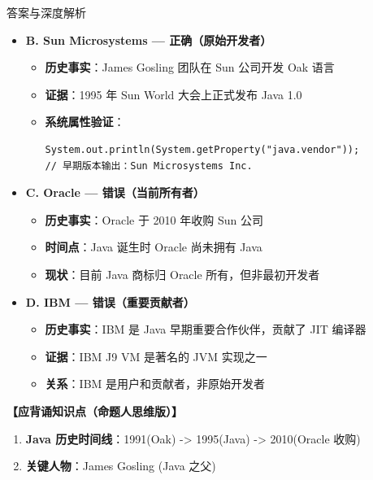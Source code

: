 \documentclass[12pt, a4paper]{ctexart}
\begin{document}
\begin{enumerate}[label=\textbf{\arabic*.}, itemsep=1em]
\begin{bluebox}{答案与深度解析}
\begin{itemize}[leftmargin=*, nosep]
        \item \textbf{B. Sun Microsystems — 正确（原始开发者）}
        \begin{itemize}[leftmargin=*, nosep]
            \item \textbf{历史事实}：James Gosling 团队在 Sun 公司开发 Oak 语言
            \item \textbf{证据}：1995 年 Sun World 大会上正式发布 Java 1.0
            \item \textbf{系统属性验证}：
            \begin{lstlisting}[style=JavaExam]
System.out.println(System.getProperty("java.vendor"));
// 早期版本输出：Sun Microsystems Inc.
            \end{lstlisting}
        \end{itemize}
        
        \item \textbf{C. Oracle — 错误（当前所有者）}
        \begin{itemize}[leftmargin=*, nosep]
            \item \textbf{历史事实}：Oracle 于 2010 年收购 Sun 公司
            \item \textbf{时间点}：Java 诞生时 Oracle 尚未拥有 Java
            \item \textbf{现状}：目前 Java 商标归 Oracle 所有，但非最初开发者
        \end{itemize}
        
        \item \textbf{D. IBM — 错误（重要贡献者）}
        \begin{itemize}[leftmargin=*, nosep]
            \item \textbf{历史事实}：IBM 是 Java 早期重要合作伙伴，贡献了 JIT 编译器
            \item \textbf{证据}：IBM J9 VM 是著名的 JVM 实现之一
            \item \textbf{关系}：IBM 是用户和贡献者，非原始开发者
        \end{itemize}
    \end{itemize}
    
    \textbf{【应背诵知识点（命题人思维版）】}
    \begin{enumerate}[leftmargin=*, nosep]
        \item \textbf{Java 历史时间线}：1991(Oak) -> 1995(Java) -> 2010(Oracle 收购)
        \item \textbf{关键人物}：James Gosling (Java 之父)
    \end{enumerate}
    

\end{bluebox}
\end{enumerate}
\end{document}
